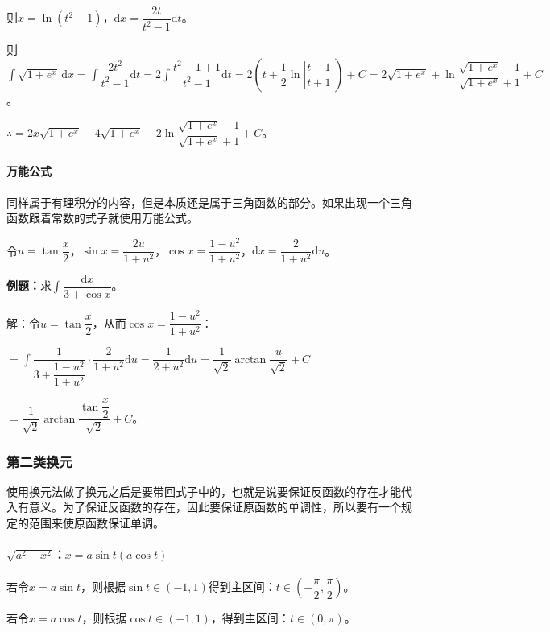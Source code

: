 \documentclass[UTF8, 12pt]{ctexart}
\begin{document}
则$x=\ln(t^2-1)$，$\textrm{d}x=\dfrac{2t}{t^2-1}\textrm{d}t$。

则$\displaystyle{\int\sqrt{1+e^x}\,\textrm{d}x=\int\dfrac{2t^2}{t^2-1}\textrm{d}t=2\int\dfrac{t^2-1+1}{t^2-1}\textrm{d}t}=2\left(t+\dfrac{1}{2}\ln\left\vert\dfrac{t-1}{t+1}\right\vert\right)+C=2\sqrt{1+e^x}+\ln\dfrac{\sqrt{1+e^x}-1}{\sqrt{1+e^x}+1}+C$。

$\therefore=2x\sqrt{1+e^x}-4\sqrt{1+e^x}-2\ln\dfrac{\sqrt{1+e^x}-1}{\sqrt{1+e^x}+1}+C$。

\paragraph{万能公式} \leavevmode \medskip

同样属于有理积分的内容，但是本质还是属于三角函数的部分。如果出现一个三角函数跟着常数的式子就使用万能公式。

令$u=\tan\dfrac{x}{2}$，$\sin x=\dfrac{2u}{1+u^2}$，$\cos x=\dfrac{1-u^2}{1+u^2}$，$\textrm{d}x=\dfrac{2}{1+u^2}\textrm{d}u$。

\textbf{例题：}求$\displaystyle{\int\dfrac{\textrm{d}x}{3+\cos x}}$。

解：令$u=\tan\dfrac{x}{2}$，从而$\cos x=\dfrac{1-u^2}{1+u^2}$：

$=\displaystyle{\int\dfrac{1}{3+\dfrac{1-u^2}{1+u^2}}\cdot\dfrac{2}{1+u^2}\textrm{d}u=\dfrac{1}{2+u^2}\textrm{d}u=\dfrac{1}{\sqrt{2}}\arctan\dfrac{u}{\sqrt{2}}+C}$

$=\dfrac{1}{\sqrt{2}}\arctan\dfrac{\tan\dfrac{x}{2}}{\sqrt{2}}+C$。

\subsubsection{第二类换元}

使用换元法做了换元之后是要带回式子中的，也就是说要保证反函数的存在才能代入有意义。为了保证反函数的存在，因此要保证原函数的单调性，所以要有一个规定的范围来使原函数保证单调。

\paragraph{\texorpdfstring{$\sqrt{a^2-x^2}$：$x=a\sin t(a\cos t)$}\ } \leavevmode \medskip

若令$x=a\sin t$，则根据$\sin t\in(-1,1)$得到主区间：$t\in\left(-\dfrac{\pi}{2},\dfrac{\pi}{2}\right)$。

若令$x=a\cos t$，则根据$\cos t\in(-1,1)$，得到主区间：$t\in(0,\pi)$。
\end{document}
